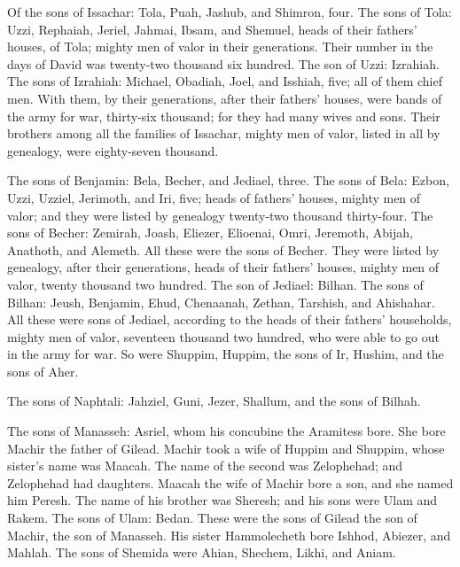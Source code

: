 \mychapter{} \myverse*{}Of the sons of Issachar: Tola, Puah, Jashub, and Shimron, four.
\myverse{}The sons of Tola: Uzzi, Rephaiah, Jeriel, Jahmai, Ibsam, and Shemuel, heads
of their fathers’ houses, of Tola; mighty men of valor in their generations. Their number in the days
of David was twenty-two thousand six hundred.
\myverse{}The son of Uzzi: Izrahiah. The sons of Izrahiah: Michael, Obadiah, Joel, and
Isshiah, five; all of them chief men.
\myverse{}With them, by their generations, after their fathers’ houses, were bands of
the army for war, thirty-six thousand; for they had many wives and sons.
\myverse{}Their brothers among all the families of Issachar, mighty men of valor, listed
in all by genealogy, were eighty-seven thousand.

\myverse{}The sons of Benjamin: Bela, Becher, and Jediael, three.
\myverse{}The sons of Bela: Ezbon, Uzzi, Uzziel, Jerimoth, and Iri, five; heads of fathers’
houses, mighty men of valor; and they were listed by genealogy twenty-two thousand thirty-four.
\myverse{}The sons of Becher: Zemirah, Joash, Eliezer, Elioenai, Omri, Jeremoth, Abijah,
Anathoth, and Alemeth. All these were the sons of Becher.
\myverse{}They were listed by genealogy, after their generations, heads of their fathers’
houses, mighty men of valor, twenty thousand two hundred.
\myverse{}The son of Jediael: Bilhan. The sons of Bilhan: Jeush, Benjamin, Ehud, Chenaanah,
Zethan, Tarshish, and Ahishahar.
\myverse{}All these were sons of Jediael, according to the heads of their fathers’ households,
mighty men of valor, seventeen thousand two hundred, who were able to go out in the army for war.
\myverse{}So were Shuppim, Huppim, the sons of Ir, Hushim, and the sons of Aher.

\myverse{}The sons of Naphtali: Jahziel, Guni, Jezer, Shallum, and the
sons of Bilhah.

\myverse{}The sons of Manasseh: Asriel, whom his concubine the Aramitess
bore. She bore Machir the father of Gilead.
\myverse{}Machir took a wife of Huppim and Shuppim, whose sister’s name was Maacah.
The name of the second was Zelophehad; and Zelophehad had daughters.
\myverse{}Maacah the wife of Machir bore a son, and she named him Peresh. The name of
his brother was Sheresh; and his sons were Ulam and Rakem.
\myverse{}The sons of Ulam: Bedan. These were the sons of Gilead the son of Machir,
the son of Manasseh.
\myverse{}His sister Hammolecheth bore Ishhod, Abiezer, and Mahlah.
\myverse{}The sons of Shemida were Ahian, Shechem, Likhi, and Aniam.


